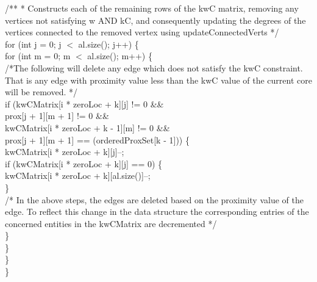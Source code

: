\begin{ttfamily   }
\begin{scriptsize}
                \noindent /**
                 * Constructs each of the remaining rows of the kwC matrix, removing any vertices
                 not satisfying w AND kC, and consequently updating the
                 degrees of the vertices connected to the removed vertex
                 using updateConnectedVerts             
                 */\\
                \noindent for (int j = 0;   j $<$ al.size();   j++) \{\\
                    \noindent for (int m = 0;    m $<$ al.size();    m++) \{\\
                        \noindent /*The following will delete any edge which does not satisfy the kwC constraint. That is
                          any edge with proximity value less than the kwC value of the current core will be removed.
                          */\\
                        if (kwCMatrix[i * zeroLoc + k][j] != 0 \&\& \\
                                prox[j + 1][m + 1] != 0 \&\& \\
                                kwCMatrix[i * zeroLoc + k - 1][m] != 0 \&\& \\
                                prox[j + 1][m + 1] == (orderedProxSet[k - 1])) \{\\
                            kwCMatrix[i * zeroLoc + k][j]--;\\
                            if (kwCMatrix[i * zeroLoc + k][j] == 0) \{\\
                                kwCMatrix[i * zeroLoc + k][al.size()]--;\\
                            \}\\
                            \noindent /*
                              In the above steps, the edges are deleted based on the proximity value of the edge. To reflect this change
                              in the data structure the corresponding entries of the concerned entities in the kwCMatrix are decremented
                             */\\
                        \}\\
                    \}\\
                \}\\
            \}\\


\end{scriptsize}
\end{ttfamily   }
